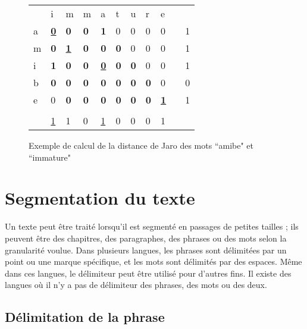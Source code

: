 \documentclass{KodeBook}
\begin{document}
\begin{figure}[!ht]
\begin{minipage}{0.45\textwidth}
\begin{tabular}{|l|l|l|l|l|l|l|l|l|l|l|}
	\cline{1-9}
	  & i & m & m & a & t & u & r & e & \multicolumn{2}{l}{ }\\
	\cline{1-9}\cline{11-11}
	a & \underline{\textbf{0}} & \textbf{0} & \textbf{0} & \textbf{1} & 0 & 0 & 0 & 0 & & 1\\
	\cline{1-9}\cline{11-11}
	m & \textbf{0} & \underline{\textbf{1}} & \textbf{0} & \textbf{0} & \textbf{0} & 0 & 0 & 0 & & 1\\
	\cline{1-9}\cline{11-11}
	i & \textbf{1} & \textbf{0} & \textbf{0} & \underline{\textbf{0}} & \textbf{0} & \textbf{0} & 0 & 0 & & 1\\
	\cline{1-9}\cline{11-11}
	b & \textbf{0} & \textbf{0} & \textbf{0} & \textbf{0} & \textbf{0} & \textbf{0} & \textbf{0} & 0 & & 0\\
	\cline{1-9}\cline{11-11}
	e & 0 & \textbf{0} & \textbf{0} & \textbf{0} & \textbf{0} & \textbf{0} & \textbf{0} & \underline{\textbf{1}} & & 1\\
	\cline{1-9}\cline{11-11}
	\multicolumn{11}{l}{ }\\
	\cline{2-9}
	\multicolumn{1}{l|}{} & \underline{1} & 1 & 0 & \underline{1} & 0 & 0 & 0 & 1 & \multicolumn{2}{l}{ }\\
	\cline{2-9}
\end{tabular}
\end{minipage}
\caption[Exemple de calcul de la distance de Jaro]{Exemple de calcul de la distance de Jaro des mots ``amibe"  et ``immature" \label{fig:jaro}}
\end{figure}

\section{Segmentation du texte}

Un texte peut être traité lorsqu'il est segmenté en passages de petites tailles ; ils peuvent être des chapitres, des paragraphes, des phrases ou des mots selon la granularité voulue.
Dans plusieurs langues, les phrases sont délimitées par un point ou une marque spécifique, et les mots sont délimités par des espaces. 
Même dans ces langues, le délimiteur peut être utilisé pour d'autres fins. 
Il existe des langues où il n'y a pas de délimiteur des phrases, des mots ou des deux.

\subsection{Délimitation de la phrase}
\end{document}

